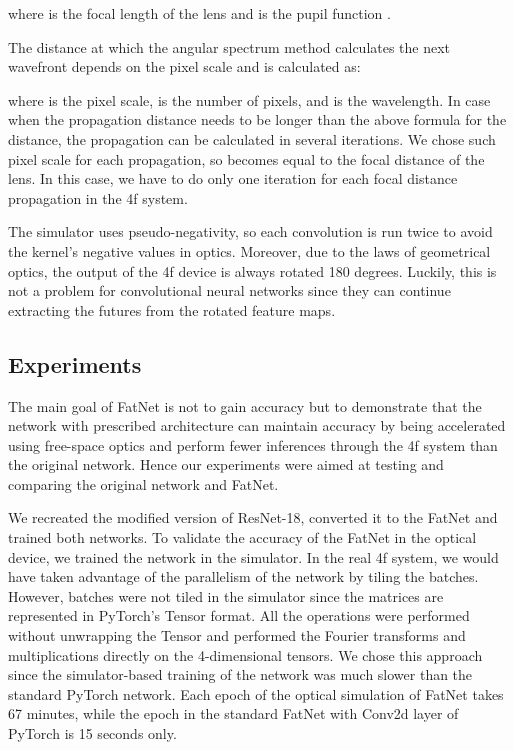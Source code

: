 \documentclass{article}
\begin{document}
where  is the focal length of the lens and  is the pupil function \cite{voelz_computational_2011}.

The distance at which the angular spectrum method calculates the next wavefront depends on the pixel scale and is calculated as:

where  is the pixel scale,  is the number of pixels, and  is the wavelength. In case when the propagation distance needs to be longer than the above formula for the distance, the propagation can be calculated in several iterations. We chose such pixel scale for each propagation, so  becomes equal to the focal distance of the lens. In this case, we have to do only one iteration for each focal distance propagation in the 4f system. 

The simulator uses pseudo-negativity, so each convolution is run twice to avoid the kernel's negative values in optics. Moreover, due to the laws of geometrical optics, the output of the 4f device is always rotated 180 degrees. Luckily, this is not a problem for convolutional neural networks since they can continue extracting the futures from the rotated feature maps. 

\subsection{Experiments}

The main goal of FatNet is not to gain accuracy but to demonstrate that the network with prescribed architecture can maintain accuracy by being accelerated using free-space optics and perform fewer inferences through the 4f system than the original network. Hence our experiments were aimed at testing and comparing the original network and FatNet. 

We recreated the modified version of ResNet-18, converted it to the FatNet and trained both networks. To validate the accuracy of the FatNet in the optical device, we trained the network in the simulator. In the real 4f system, we would have taken advantage of the parallelism of the network by tiling the batches. However, batches were not tiled in the simulator since the matrices are represented in PyTorch's Tensor format. All the operations were performed without unwrapping the Tensor and performed the Fourier transforms and multiplications directly on the 4-dimensional tensors. We chose this approach since the simulator-based training of the network was much slower than the standard PyTorch network. Each epoch of the optical simulation of FatNet takes 67 minutes, while the epoch in the standard FatNet with Conv2d layer of PyTorch is 15 seconds only. 
\end{document}
